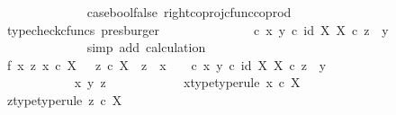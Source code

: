 \begin{isabellebody}
\ \ \ \ \ \ \ \ \ \ \ \ \isamarkupfalse%
\ case{\isacharunderscore}{\kern0pt}bool{\isacharunderscore}{\kern0pt}false\ right{\isacharunderscore}{\kern0pt}coproj{\isacharunderscore}{\kern0pt}cfunc{\isacharunderscore}{\kern0pt}coprod\ \isamarkupfalse%
\ {\isacharparenleft}{\kern0pt}typecheck{\isacharunderscore}{\kern0pt}cfuncs{\isacharcomma}{\kern0pt}\ presburger{\isacharparenright}{\kern0pt}\isanewline
\ \ \ \ \ \ \ \ \ \ \isamarkupfalse%
\ \isamarkupfalse%
\ {\isachardoublequoteopen}{\isacharparenleft}{\kern0pt}{\isasymTheta}\ {\isasymcirc}\isactrlsub c\ {\isasymlangle}x{\isacharcomma}{\kern0pt}\ y{\isasymrangle}{\isacharparenright}{\kern0pt}\isactrlsup {\isasymflat}\ {\isasymcirc}\isactrlsub c\ {\isasymlangle}id\ X{\isacharcomma}{\kern0pt}\ {\isasymbeta}\isactrlbsub X\isactrlesub {\isasymrangle}\ {\isasymcirc}\isactrlsub c\ z\ {\isacharequal}{\kern0pt}\ y{}{\isachardoublequoteclose}\isanewline
\ \ \ \ \ \ \ \ \ \ \ \ \isamarkupfalse%
\ {\isacharparenleft}{\kern0pt}simp\ add{\isacharcolon}{\kern0pt}\ calculation{\isacharparenright}{\kern0pt}\isanewline
\ \ \ \ \ \ \ \ \isamarkupfalse%
\isanewline
\ \ \ \ \ \ \ \ \isanewline
\ \ \ \ \ \ \ \ \isamarkupfalse%
\ f{}{\isacharcolon}{\kern0pt}\ {\isachardoublequoteopen}{\isasymAnd}x\ z{\isachardot}{\kern0pt}\ x\ {\isasymin}\isactrlsub c\ X\ {\isasymLongrightarrow}\ \ z\ {\isasymin}\isactrlsub c\ X\ {\isasymLongrightarrow}\ z\ {\isasymnoteq}\ x\ {\isasymLongrightarrow}\ \ {\isacharparenleft}{\kern0pt}{\isasymTheta}\ {\isasymcirc}\isactrlsub c\ {\isasymlangle}x{\isacharcomma}{\kern0pt}\ y{}{\isasymrangle}{\isacharparenright}{\kern0pt}\isactrlsup {\isasymflat}\ {\isasymcirc}\isactrlsub c\ {\isasymlangle}id\ X{\isacharcomma}{\kern0pt}\ {\isasymbeta}\isactrlbsub X\isactrlesub {\isasymrangle}\ {\isasymcirc}\isactrlsub c\ z\ {\isacharequal}{\kern0pt}\ y{}{\isachardoublequoteclose}\isanewline
\ \ \ \ \ \ \ \ \isamarkupfalse%
\ {\isacharminus}{\kern0pt}\ \isanewline
\ \ \ \ \ \ \ \ \ \ \isamarkupfalse%
\ x\ y\ z\isanewline
\ \ \ \ \ \ \ \ \ \ \isamarkupfalse%
\ x{\isacharunderscore}{\kern0pt}type{\isacharbrackleft}{\kern0pt}type{\isacharunderscore}{\kern0pt}rule{\isacharbrackright}{\kern0pt}{\isacharcolon}{\kern0pt}\ {\isachardoublequoteopen}x\ {\isasymin}\isactrlsub c\ X{\isachardoublequoteclose}\isanewline
\ \ \ \ \ \ \ \ \ \ \isamarkupfalse%
\ z{\isacharunderscore}{\kern0pt}type{\isacharbrackleft}{\kern0pt}type{\isacharunderscore}{\kern0pt}rule{\isacharbrackright}{\kern0pt}{\isacharcolon}{\kern0pt}\ {\isachardoublequoteopen}z\ {\isasymin}\isactrlsub c\ X{\isachardoublequoteclose}\isanewline

\end{isabellebody}
